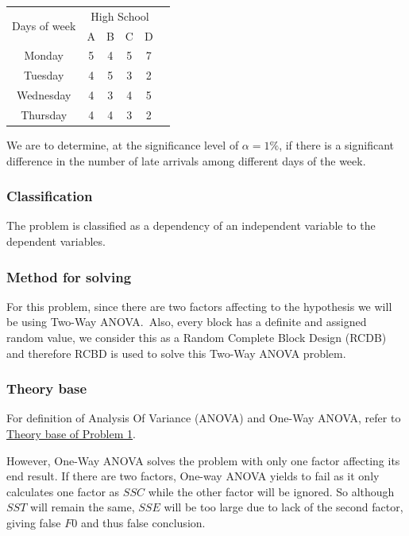 \documentclass[a4paper]{article}
\numberwithin{equation}{section}
\begin{document}
\begin{center}
  \begin{tabular}{cccccc}
    \toprule
    \multirow{2}{*}{Days of week} & \multicolumn{4}{c}{High School}             \\
    \cmidrule(lr){2-5}            & A                               & B & C & D \\
    \midrule
    Monday                        & 5                               & 4 & 5 & 7 \\
    Tuesday                       & 4                               & 5 & 3 & 2 \\
    Wednesday                     & 4                               & 3 & 4 & 5 \\
    Thursday                      & 4                               & 4 & 3 & 2 \\
    \bottomrule
  \end{tabular}
\end{center}

We are to determine, at the significance level of \( \alpha = 1\% \), if there is a significant difference in the number of late arrivals among different days of the week.

\subsubsection{Classification}
The problem is classified as a dependency of an independent variable to the dependent variables.

\subsubsection{Method for solving}
For this problem, since there are two factors affecting to the hypothesis we will be using Two-Way ANOVA.\
Also, every block has a definite and assigned random value, we consider this as a Random Complete Block Design (RCDB) and therefore RCBD is used to solve this Two-Way ANOVA problem.

\subsubsection{Theory base}

For definition of Analysis Of Variance (ANOVA) and One-Way ANOVA, refer to \hyperref[anovaDef]{\underline{Theory base of Problem 1}}.

However, One-Way ANOVA solves the problem with only one factor affecting its end result. If there are two factors, One-way ANOVA yields to fail as it only calculates one factor as \(SSC\) while the other factor will be ignored. So although \(SST\) will remain the same, \(SSE\) will be too large due to lack of the second factor, giving false \(F0\) and thus false conclusion.
\end{document}
